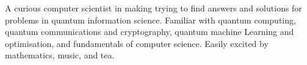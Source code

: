 

\begin{cvparagraph}


A curious computer scientist in making trying to find answers and solutions for problems in quantum information science. Familiar with quantum computing, quantum communications and cryptography, quantum machine Learning and optimisation, and fundamentals of computer science. Easily excited by mathematics, music, and tea.

\end{cvparagraph}
